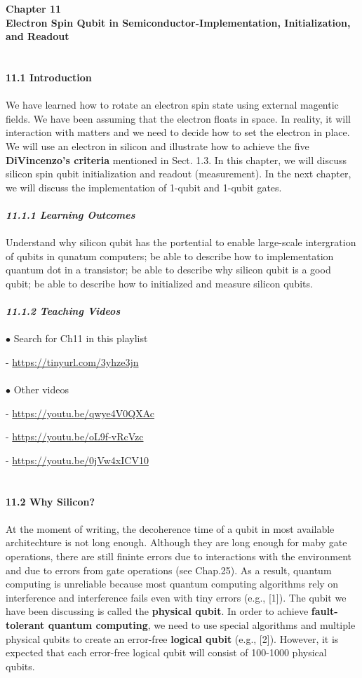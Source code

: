 \documentclass{article}
\newcommand{\bfit}[1]{\textit{\textbf{#1}}}
\begin{document}
\textbf{\Large Chapter 11\\
Electron Spin Qubit in Semiconductor-Implementation, Initialization, and Readout}
\\\\\\
\textbf{\large 11.1 Introduction}\\\\
We have learned how to rotate an electron spin state using external magentic fields.
We have been assuming that the electron floats in space. In reality, it will interaction
with matters and we need to decide how to set the electron in place. We will use an electron
in silicon and illustrate how to achieve the five \textbf{DiVincenzo's criteria}
mentioned in Sect. 1.3. In this chapter, we will discuss silicon spin qubit
initialization and readout (measurement). In the next chapter, we will discuss the
implementation of 1-qubit and 1-qubit gates.\\\\
\bfit{\large 11.1.1 Learning Outcomes}\\\\
Understand why silicon qubit has the portential to enable large-scale intergration of qubits
in qunatum computers; be able to describe how to implementation quantum dot in 
a transistor; be able to describe why silicon qubit is a good qubit; be able to describe
how to initialized and measure silicon qubits.\\\\
\bfit{\large 11.1.2 Teaching Videos}\\\\
$\bullet$ Search for Ch11 in this playlist

- \url{https://tinyurl.com/3yhze3jn}\\\\
$\bullet$ Other videos

- \url{https://youtu.be/qwye4V0QXAc}

- \url{https://youtu.be/oL9f-vRcVzc}

- \url{https://youtu.be/0jVw4xICV10}\\\\\\
\textbf{\large 11.2 Why Silicon?}\\\\
At the moment of writing, the decoherence time of a qubit in most available
architechture is not long enough. Although they are long enough for maby gate
operations, there are still fininte errors due to interactions with the environment and
due to errors from gate operations (see Chap.25). As a result, quantum computing
is unreliable because most quantum computing algorithms rely on interference
and  interference fails even with tiny errors (e.g., [1]). The qubit we have been
discussing is called the \textbf{physical qubit}. In order to achieve \textbf{fault-tolerant quantum
computing}, we need to use special algorithms and multiple physical qubits to create
an error-free \textbf{logical qubit} (e.g., [2]). However, it is expected that each error-free
logical qubit will consist of 100-1000 physical qubits.
\end{document}
